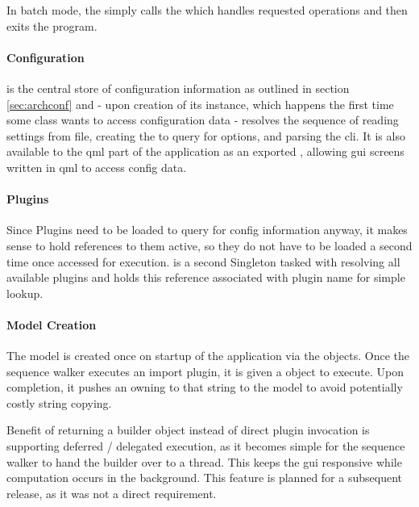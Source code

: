 In batch mode, the  simply calls the  which handles requested operations and then exits the program.

\paragraph{Configuration}
 is the central store of configuration information as outlined in section \ref{sec:archconf} and - upon creation of its instance, which happens the first time some class wants to access configuration data - resolves the sequence of reading settings from file, creating the  to query for options, and parsing the \gls{cli}. It is also available to the \gls{qml} part of the application as an exported , allowing \gls{gui} screens written in \gls{qml} to access config data.

\paragraph{Plugins} Since Plugins need to be loaded to query for config information anyway, it makes sense to hold references to them active, so they do not have to be loaded a second time once accessed for execution.  is a second Singleton tasked with resolving all available plugins and holds this reference associated with plugin name for simple lookup.

\paragraph{Model Creation} The model is created once on startup of the application via the  objects. Once the sequence walker executes an import plugin, it is given a  object to execute. Upon completion, it pushes an owning  to that string to the model to avoid potentially costly string copying.

Benefit of returning a builder object instead of direct plugin invocation is supporting deferred / delegated execution, as it becomes simple for the sequence walker to hand the builder over to a thread. This keeps the \gls{gui} responsive while computation occurs in the background. This feature is planned for a subsequent release, as it was not a direct requirement.

